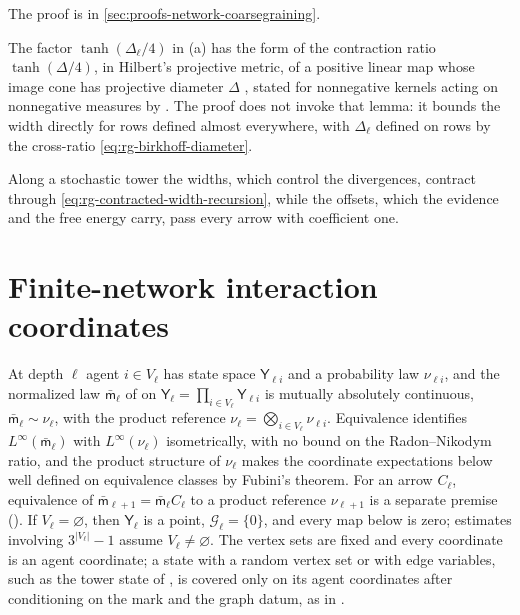 The proof is in \cref{sec:proofs-network-coarsegraining}.

The factor $\tanh(\Delta_\ell/4)$ in (a) has the form of the contraction ratio $\tanh(\Delta/4)$, in
Hilbert's projective metric, of a positive linear map whose image cone has projective diameter
$\Delta$ \citep[Sec.~4, Lemma~1, Eq.~(9a)]{Birkhoff1957}, stated for nonnegative kernels acting on
nonnegative measures by \citet[Lemma~3.8, Eq.~(11)]{LeGlandOudjane2004}. The proof does not invoke
that lemma: it bounds the width directly for rows defined almost everywhere, with $\Delta_\ell$
defined on rows by the cross-ratio \eqref{eq:rg-birkhoff-diameter}.

Along a stochastic tower the widths, which control the divergences, contract through
\eqref{eq:rg-contracted-width-recursion}, while the offsets, which the evidence and
the free energy carry, pass every arrow with coefficient one.

\section{Finite-network interaction coordinates}
\label{sec:rg-finite-network-interactions}

At depth $\ell$ agent $i\in V_\ell$ has state space $\mathsf Y_{\ell i}$ and a
probability law $\nu_{\ell i}$, and the normalized law $\bar{\mathsf m}_\ell$ of
 on $\mathsf Y_\ell=\prod_{i\in V_\ell}\mathsf Y_{\ell i}$
is mutually absolutely continuous, $\bar{\mathsf m}_\ell\sim\nu_\ell$, with the
product reference $\nu_\ell=\bigotimes_{i\in V_\ell}\nu_{\ell i}$. Equivalence
identifies $L^\infty(\bar{\mathsf m}_\ell)$ with $L^\infty(\nu_\ell)$
isometrically, with no bound on the Radon--Nikodym ratio, and the product
structure of $\nu_\ell$ makes the coordinate expectations below well defined on
equivalence classes by Fubini's theorem. For an arrow $C_\ell$, equivalence of
$\bar{\mathsf m}_{\ell+1}=\bar{\mathsf m}_\ell C_\ell$ to a product reference
$\nu_{\ell+1}$ is a separate premise
(). If $V_\ell=\varnothing$, then
$\mathsf Y_\ell$ is a point, $\mathcal G_\ell=\{0\}$, and every map below is zero;
estimates involving $3^{\lvert V_\ell\rvert}-1$ assume $V_\ell\ne\varnothing$. The vertex sets
are fixed and every coordinate is an agent coordinate; a state with a random vertex set or with
edge variables, such as the tower state of , is covered only
on its agent coordinates after conditioning on the mark and the graph datum, as in
.

